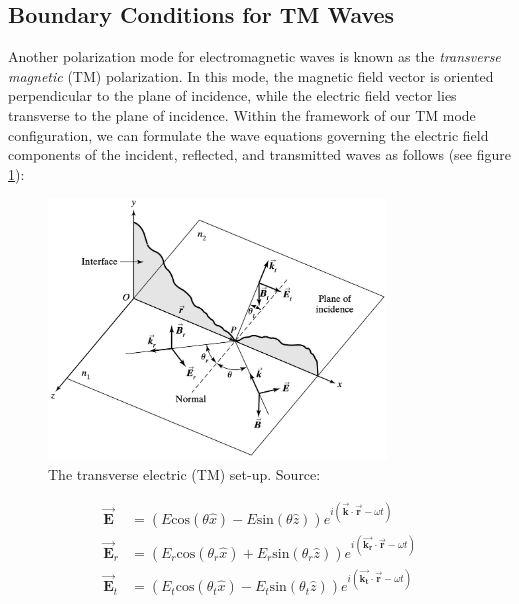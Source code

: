 \subsection{Boundary Conditions for TM Waves}
Another polarization mode for electromagnetic waves is known as the \textit{transverse magnetic} (TM) polarization. In this mode, the magnetic field vector is oriented perpendicular to the plane of incidence, while the electric field vector lies transverse to the plane of incidence. Within the framework of our TM mode configuration, we can formulate the wave equations governing the electric field components of the incident, reflected, and transmitted waves as follows (see figure \ref{fig: The TM set-up}):

\begin{figure}[ht!]
  \centering
  \includegraphics[width=0.8\textwidth]{Chapters/Figures/Chapter 2 Figures/Incident, Reflected, and Transmitted Ray for TM Mode.jpg}
  \caption[The transverse electric (TM) set-up]{The transverse electric (TM) set-up. Source: \cite{pedrotti_introduction_2007}}
  \label{fig: The TM set-up}
\end{figure}

\begin{align*} 
\vec{\mathbf{E}} &= (E\mathrm{cos}(\theta \hat{x}) - E\mathrm{sin}(\theta \hat{z})) e^{i(\vec{\mathbf{k}} \cdot \vec{\mathbf{r}} - \omega t)} \\
\vec{\mathbf{E}}_r &= (E_r\mathrm{cos}(\theta_r \hat{x}) + E_r\mathrm{sin}(\theta_r \hat{z})) e^{i(\vec{\mathbf{k_r}} \cdot \vec{\mathbf{r}} - \omega t)} \\ 
\vec{\mathbf{E}}_t &= (E_t\mathrm{cos}(\theta_t \hat{x}) - E_t\mathrm{sin}(\theta_t \hat{z})) e^{i(\vec{\mathbf{k_t}} \cdot \vec{\mathbf{r}} - \omega t)}
\end{align*}

